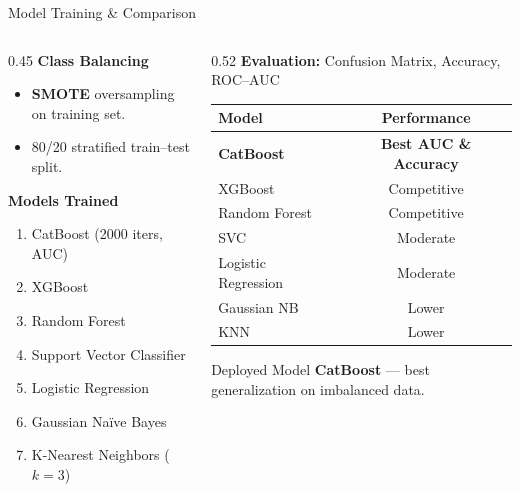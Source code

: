 \documentclass[aspectratio=169]{beamer}
\begin{document}
\begin{frame}{Model Training \& Comparison}
  \small
  \begin{columns}[T]
    \begin{column}{0.45\textwidth}
      \textbf{Class Balancing}
      \begin{itemize}\setlength\itemsep{2pt}
        \item \textbf{SMOTE} oversampling on training set.
        \item 80/20 stratified train--test split.
      \end{itemize}
      \vspace{0.4em}
      \textbf{Models Trained}
      \begin{enumerate}\setlength\itemsep{2pt}
        \item CatBoost (2000 iters, AUC)
        \item XGBoost
        \item Random Forest
        \item Support Vector Classifier
        \item Logistic Regression
        \item Gaussian Na\"ive Bayes
        \item K-Nearest Neighbors ($k\!=\!3$)
      \end{enumerate}
    \end{column}
    \begin{column}{0.52\textwidth}
      \textbf{Evaluation:} Confusion Matrix, Accuracy, ROC--AUC
      \vspace{0.3em}

      \centering
      \begin{tabular}{lc}
        \toprule
        \textbf{Model} & \textbf{Performance} \\
        \midrule
        \textbf{CatBoost} & \textbf{Best AUC \& Accuracy} \\
        XGBoost & Competitive \\
        Random Forest & Competitive \\
        SVC & Moderate \\
        Logistic Regression & Moderate \\
        Gaussian NB & Lower \\
        KNN & Lower \\
        \bottomrule
      \end{tabular}
      \vspace{0.5em}

      \begin{block}{Deployed Model}
        \textbf{CatBoost} --- best generalization on imbalanced data.
      \end{block}
    \end{column}
  \end{columns}
\end{frame}
\end{document}
